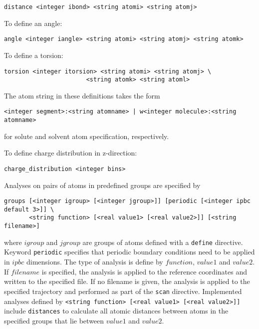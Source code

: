 \begin{verbatim}
distance <integer ibond> <string atomi> <string atomj> 
\end{verbatim}

To define an angle:

\begin{verbatim}
angle <integer iangle> <string atomi> <string atomj> <string atomk> 
\end{verbatim}

To define a torsion:

\begin{verbatim}
torsion <integer itorsion> <string atomi> <string atomj> \
                       <string atomk> <string atoml> 
\end{verbatim}

The atom string in these definitions takes the form

\begin{verbatim}
<integer segment>:<string atomname> | w<integer molecule>:<string atomname>
\end{verbatim}

for solute and solvent atom specification, respectively.

To define charge distribution in z-direction:

\begin{verbatim}
charge_distribution <integer bins>
\end{verbatim}

Analyses on pairs of atoms in predefined groups are specified by

\begin{verbatim}
groups [<integer igroup> [<integer jgroup>]] [periodic [<integer ipbc default 3>]] \ 
       <string function> [<real value1> [<real value2>]] [<string filename>]
\end{verbatim}

where $igroup$ and $jgroup$ are groups of atoms defined with a
\verb+define+ directive. Keyword \verb+periodic+ specifies that
periodic boundary conditions need to be applied in $ipbc$ dimensions.
The type of analysis is define by $function$, $value1$ and $value2$.
If $filename$ is specified, the analysis is applied to the reference
coordinates and written to the specified file. If no filename is
given, the analysis is applied to the specified trajectory and 
performed as part of the \verb+scan+ directive.
Implemented analyses defined by 
\verb+<string function> [<real value1> [<real value2>]]+ include
\verb+distances+ to calculate all atomic distances between atoms
in the specified groups that lie between $value1$ and $value2$.

